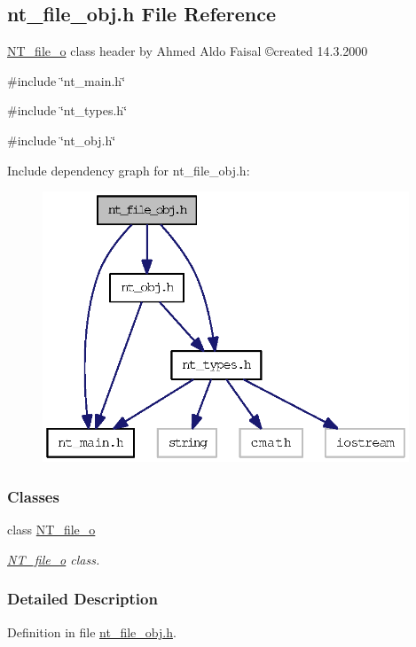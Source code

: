 \subsection{nt\_\-file\_\-obj.h File Reference}
\label{nt__file__obj_8h}



\begin{DoxyItemize}
\item \hyperlink{class_n_t__file__o}{NT\_\-file\_\-o} class header by Ahmed Aldo Faisal \copyright created 14.3.2000 
\end{DoxyItemize} 


{\ttfamily \#include \char`\"{}nt\_\-main.h\char`\"{}}\par
{\ttfamily \#include \char`\"{}nt\_\-types.h\char`\"{}}\par
{\ttfamily \#include \char`\"{}nt\_\-obj.h\char`\"{}}\par
Include dependency graph for nt\_\-file\_\-obj.h:
\nopagebreak
\begin{figure}[H]
\begin{center}
\leavevmode
\includegraphics[width=310pt]{nt__file__obj_8h__incl}
\end{center}
\end{figure}
\subsubsection*{Classes}
\begin{DoxyCompactItemize}
\item 
class \hyperlink{class_n_t__file__o}{NT\_\-file\_\-o}
\begin{DoxyCompactList}\small\item\em \hyperlink{class_n_t__file__o}{NT\_\-file\_\-o} class. \item\end{DoxyCompactList}\end{DoxyCompactItemize}


\subsubsection{Detailed Description}


Definition in file \hyperlink{nt__file__obj_8h_source}{nt\_\-file\_\-obj.h}.


